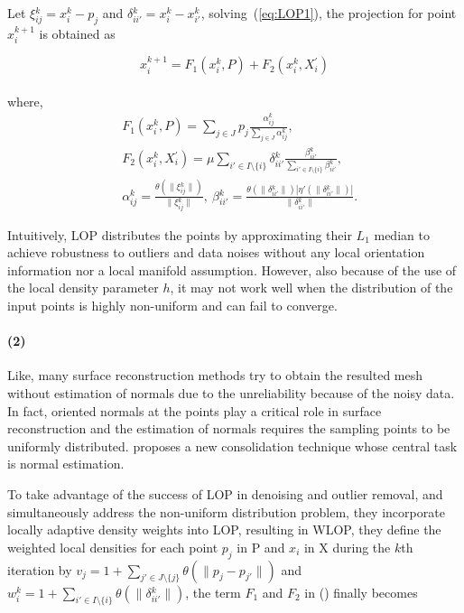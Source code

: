 Let $\xi{_{ij}^k}=x{_i^k}-p_{j}$ and $\delta{_{ii'}^k}=x{_i^k}-x{_{i'}^k}$, solving~(\ref{eq:LOP1}), the projection for point $x{_i^{k+1}}$ is obtained as

\small{
\begin{equation}
 \label{eq:LOP3}
 x{_i^{k+1}}=F_1(x{_i^k},P)+F_2(x{_i^k},X{_i^{'}})
\end{equation}
}
\\
where,
\small{
\begin{equation}
 \label{eq:LOP4}
 \begin{split}
 & F_1(x{_i^k},P)=\sum_{j\in J}^{}p_{j}\frac{\alpha{_{ij}^k}}{\sum_{j\in J}^{}\alpha{_{ij}^k}},\\
 & F_2(x{_i^k},X{_i^{'}})=\mu\sum_{{i'}\in I\setminus\{i\}}^{}\delta{_{ii'}^k}\frac{\beta{_{ii'}^k}}{\sum_{{i'}\in I\setminus\{i\}}^{}\beta{_{ii'}^k}},\\
 & \alpha{_{ij}^k}=\frac{\theta(\|\xi{_{ij}^k}\|)}{\|\xi{_{ij}^k}\|},
   ~\beta{_{ii'}^k}=\frac{\theta(\|\delta{_{ii'}^k}\|)|\eta'(\|\delta{_{ii'}^k}\|)|}{\|\delta{_{ii'}^k}\|}.
 \end{split}
\end{equation}
}

Intuitively, LOP distributes the points by approximating their $L_1$ median to achieve robustness to outliers and data noises without any local orientation information nor a local manifold assumption.
However, also because of the use of the local density parameter $h$, it may not work well when the distribution of the input points is highly non-uniform and can fail to converge.

\paragraph{(2)}

Like\cite{lipman2007parameterization}, many surface reconstruction methods try to obtain the resulted mesh without estimation of normals due to the unreliability because of the noisy data.
In fact, oriented normals at the points play a critical role in surface reconstruction and the estimation of normals requires the sampling points to be uniformly distributed.
\cite{huang2009consolidation} proposes a new consolidation technique whose central task is normal estimation.

To take advantage of the success of LOP in denoising and outlier removal, and simultaneously address the non-uniform distribution problem, they incorporate locally adaptive density weights into LOP, resulting in WLOP, they define the weighted local densities for each point $p_{j}$ in P and $x_{i}$ in X during the $k$th iteration by $v_{j}=1+\sum_{j'\in J\setminus\{j\}}^{}\theta(\|p_{j}-p_{j'}\|)$ and $w{_i^k}=1+\sum_{i'\in I\setminus\{i\}}^{}\theta(\|\delta{_{ii'}^k}\|)$, the term $F_1$ and $F_2$ in () finally becomes

